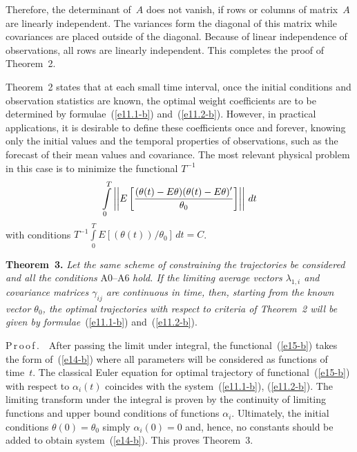 \begin{multicols}{2}
Therefore, the determinant of~$A$ does not vanish, if rows or columns of matrix~$A$ 
are linearly independent. The variances form the diagonal of this matrix while 
covariances are placed outside of the diagonal. Because of linear independence 
of observations, all rows are linearly independent. This completes the proof of Theorem~2.

Theorem~2 states that at each small time interval, once the initial conditions and observation 
statistics are known, the optimal weight coefficients are to be determined by 
formulae~(\ref{e11.1-b}) and~(\ref{e11.2-b}). 
However, in practical applications, it is desirable to define these coefficients once and 
forever, knowing only the initial values and the temporal properties of observations, such 
as the forecast of their mean values and covariance. The most relevant physical problem in 
this case is to minimize the functional  $T^{-1}$
\begin{equation}
\int\limits_{0}^{T} \left\vert\left\vert E
\left[\displaystyle\frac{\displaystyle (\theta (t)-E\theta )(\theta (t)-E\theta )'\mathstrut}{\displaystyle \theta_{0}\mathstrut} \right]\right\vert\right\vert \,dt  
\label{e15-b}
\end{equation}
with conditions $T^{-1} \int\limits_{0}^{T} E\left[(\theta (t))^{} /\theta_{0} \right]\,dt=C $.

\medskip

\noindent 
\textbf{Theorem~3.}
\textit{Let the same scheme of constraining the trajectories be considered and all the 
conditions} A0--A6 \textit{hold. If the limiting average vectors $\lambda_{1,i} $ and 
covariance matrices $\gamma_{ij} $ are continuous in time, then, starting from 
the known vector $\theta_{0} $, the optimal trajectories with respect to criteria 
of Theorem~2 will be given by formulae}~(\ref{e11.1-b}) and~(\ref{e11.2-b}).

\medskip


\noindent 
P\,r\,o\,o\,f\,.\ \ 
After passing the limit under integral,
 the functional~(\ref{e15-b}) takes the form of~(\ref{e14-b}) 
where all parameters will be considered as functions of time~$t$. The classical Euler 
equation for optimal trajectory of functional~(\ref{e15-b}) with respect to $\alpha_{i}(t)$ 
coincides with the system~(\ref{e11.1-b}), (\ref{e11.2-b}).  The limiting transform 
under the integral is proven by the continuity of limiting functions and upper bound conditions of functions $\alpha_{i}$. 
Ultimately, the initial conditions $\theta (0)=\theta_{0} $ simply $\alpha_{i} (0)=0$ 
and, hence, no constants should be added to obtain system~(\ref{e14-b}). This proves Theorem~3.


\end{multicols}

